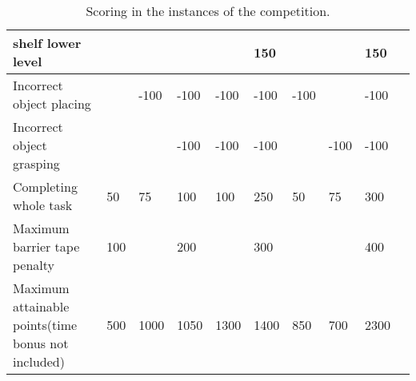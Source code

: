 \begin{landscape}
\begin{table}
\begin{tabular}{|p{5.5cm}*{9}{|P{1cm}}|}
		\hspace{0.5cm} shelf lower level  &      &      &       &       &  150  &       &       &  150  \\ \hline
    Incorrect object placing        &      & -100 & -100  & -100  & -100  & -100  &       & -100  \\
    Incorrect object grasping       &      &      & -100  & -100  & -100  &       & -100  & -100  \\
    Completing whole task           &  50  &  75  &   100  &   100   &   250  &    50    &   75   &  300   \\ \hline\hline
    Maximum barrier \newline tape penalty    &  100  &      &  200  &       &  300  &       &       &  400  \\ \hline\hline
    Maximum attainable points\newline (time bonus not included)
	                                  & 500  &  1000 &  1050 &  1300  &  1400  &  850  &  700  &  2300 \\ \hline
 \end{tabular}
 \caption{Scoring in the instances of the \RCAW \YEAR competition.}
  \label{tab:InstancePoints}
\end{table}
\end{landscape}
